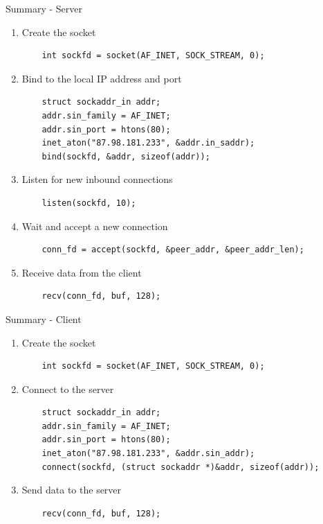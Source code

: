 \begin{frame}[fragile]{Summary - Server}
	\begin{enumerate}
		\item Create the socket \\
			\begin{verbatim}
    int sockfd = socket(AF_INET, SOCK_STREAM, 0);
			\end{verbatim}
		\item Bind to the local IP address and port \\
			\begin{verbatim}
    struct sockaddr_in addr;
    addr.sin_family = AF_INET;
    addr.sin_port = htons(80);
    inet_aton("87.98.181.233", &addr.in_saddr);
    bind(sockfd, &addr, sizeof(addr));
			\end{verbatim}
		\item Listen for new inbound connections \\
			\begin{verbatim}
    listen(sockfd, 10);
			\end{verbatim}
		\item Wait and accept a new connection \\
			\begin{verbatim}
    conn_fd = accept(sockfd, &peer_addr, &peer_addr_len);
			\end{verbatim}
		\item Receive data from the client \\
			\begin{verbatim}
    recv(conn_fd, buf, 128);
			\end{verbatim}
	\end{enumerate}
\end{frame}

\begin{frame}[fragile]{Summary - Client}
	\begin{enumerate}
		\item Create the socket \\
			\begin{verbatim}
    int sockfd = socket(AF_INET, SOCK_STREAM, 0);
			\end{verbatim}
		\item Connect to the server \\
			\begin{verbatim}
    struct sockaddr_in addr;
    addr.sin_family = AF_INET;
    addr.sin_port = htons(80);
    inet_aton("87.98.181.233", &addr.sin_addr);
    connect(sockfd, (struct sockaddr *)&addr, sizeof(addr));
			\end{verbatim}
		\item Send data to the server \\
			\begin{verbatim}
    recv(conn_fd, buf, 128);
			\end{verbatim}
	\end{enumerate}
\end{frame}

